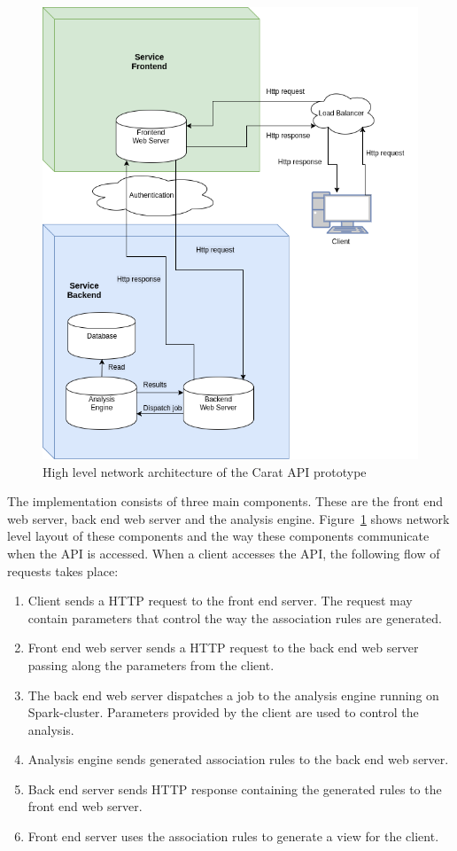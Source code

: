 \begin{figure} %
	\centering
	\includegraphics[width=\textwidth]{images/carat-prototype-architecture.png}
	\caption{High level network architecture of the Carat API prototype}
	\label{figure:carat-api-network-prototype}
\end{figure}         

The implementation consists of three main components. These are the front end web server, back end web server and the analysis engine. Figure~\ref{figure:carat-api-network-prototype} shows network level layout of these components and the way these components communicate when the API is accessed. When a client accesses the API, the following flow of requests takes place:
\begin{enumerate}
	\item Client sends a HTTP request to the front end server. The request may contain parameters that control the way the association rules are generated.
	\item Front end web server sends a HTTP request to the back end web server passing along the parameters from the client.
	\item The back end web server dispatches a job to the analysis engine running on Spark-cluster. Parameters provided by the client are used to control the analysis.
	\item Analysis engine sends generated association rules to the back end web server.
	\item Back end server sends HTTP response containing the generated rules to the front end web server.
	\item Front end server uses the association rules to generate a view for the client.  
\end{enumerate}

